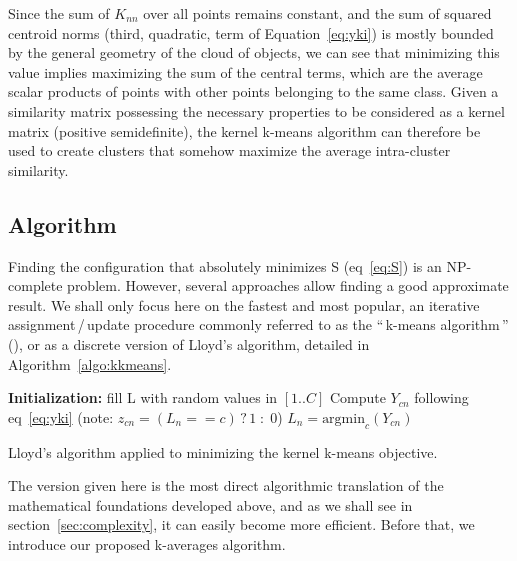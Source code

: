 \documentclass[a4paper,twoside]{article}
\newcommand{\gl}[1]{``\,#1\,''} %
\begin{document}

Since the sum of $K_{nn}$ over all points remains constant, and the sum of squared centroid norms (third, quadratic, term of Equation~\ref{eq:yki}) is mostly bounded by the general geometry of the cloud of objects, we can see that minimizing this value implies maximizing the sum of the central terms, which are the average scalar products of points with other points belonging to the same class. Given a similarity matrix possessing the necessary properties to be considered as a kernel matrix (positive semidefinite), the kernel k-means algorithm can therefore be used to create clusters that somehow maximize the average intra-cluster similarity.

\subsection{Algorithm}

Finding the configuration that absolutely minimizes S (eq~\ref{eq:S}) is an NP-complete problem. However, several approaches allow finding a good approximate result. We shall only focus here on the fastest and most popular, an iterative assignment\,/\,update procedure commonly referred to as the \gl{k-means algorithm} (\cite{macQueenBsmsp67}), or as a discrete version of Lloyd's algorithm, detailed in Algorithm~\ref{algo:kkmeans}.

\begin{algorithm}
	\label{algo:kkmeans}
	\SetAlgoLined
	\BlankLine	
	\textbf{Initialization:} fill L with random values in $[1..C]$\;
	\BlankLine	
	 {
		 {
			 {
				Compute $Y_{cn}$ following eq~\ref{eq:yki} \label{algline:kkmeans_cplx1}
				(note: $z_{cn} = (L_n == c)\,?\,1\;:\;0$)
			}
			$L_n = \textrm{argmin}_c (Y_{cn})$\;
		}
	}
	\BlankLine
	\caption{Lloyd's algorithm applied to minimizing the kernel k-means objective.}
\end{algorithm}

The version given here is the most direct algorithmic translation of the mathematical foundations developed above, and as we shall see in section~\ref{sec:complexity}, it can easily become more efficient. Before that, we introduce our proposed k-averages algorithm.
\end{document}
